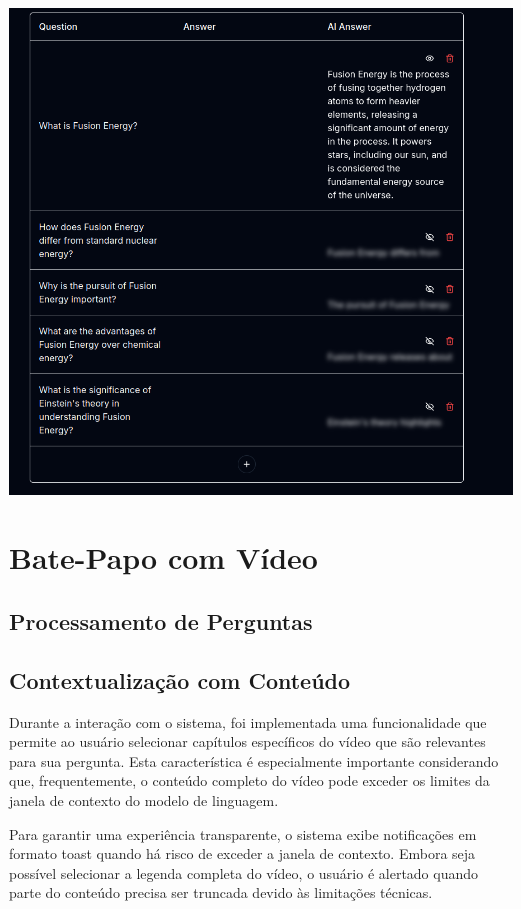 \documentclass[tcc,capa]{texufpel}
\begin{document}
\includegraphics[width=\textwidth,height=\textheight,keepaspectratio]{exemplo-slides/graphics/images/q_a.png}

\section{Bate-Papo com Vídeo}
\subsection{Processamento de Perguntas}
\subsection{Contextualização com Conteúdo}
Durante a interação com o sistema, foi implementada uma funcionalidade que permite ao usuário selecionar capítulos específicos do vídeo que são relevantes para sua pergunta. Esta característica é especialmente importante considerando que, frequentemente, o conteúdo completo do vídeo pode exceder os limites da janela de contexto do modelo de linguagem.

Para garantir uma experiência transparente, o sistema exibe notificações em formato toast quando há risco de exceder a janela de contexto. Embora seja possível selecionar a legenda completa do vídeo, o usuário é alertado quando parte do conteúdo precisa ser truncada devido às limitações técnicas.
\end{document}
